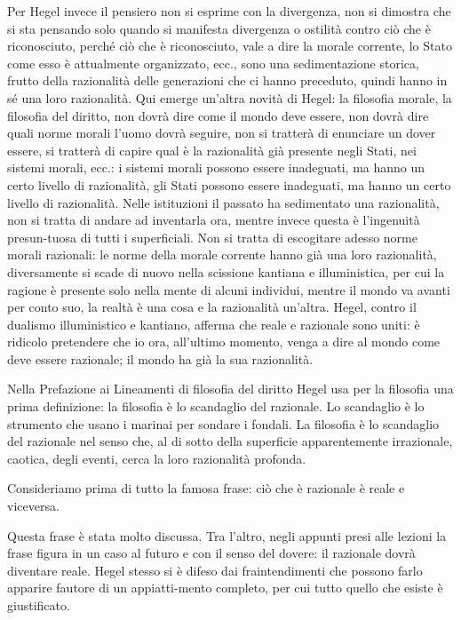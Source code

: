 \documentclass[a4paper,12pt,oneside,openany]{book}%
\begin{document}
Per Hegel invece il pensiero non si esprime con la divergenza, non si dimostra che si sta pensando solo quando si manifesta divergenza o ostilità contro ciò che è riconosciuto, perché ciò che è riconosciuto, vale a dire la morale corrente, lo Stato come esso è attualmente organizzato, ecc., sono una sedimentazione storica, frutto della razionalità delle generazioni che ci hanno preceduto, quindi hanno in sé una loro razionalità. Qui emerge un’altra novità di Hegel: la filosofia morale, la filosofia del diritto, non dovrà dire come il mondo deve essere, non dovrà dire quali norme morali l’uomo dovrà seguire, non si tratterà di enunciare un dover essere, si tratterà di capire qual è la razionalità già presente negli Stati, nei sistemi morali, ecc.: i sistemi morali possono essere inadeguati, ma hanno un certo livello di razionalità, gli Stati possono essere inadeguati, ma hanno un certo livello di razionalità. Nelle istituzioni il passato ha sedimentato una razionalità, non si tratta di andare ad inventarla ora, mentre invece questa è l’ingenuità presun-tuosa di tutti i superficiali. Non si tratta di escogitare adesso norme morali razionali: le norme della morale corrente hanno già una loro razionalità, diversamente si scade di nuovo nella scissione kantiana e illuministica, per cui la ragione è presente solo nella mente di alcuni individui, mentre il mondo va avanti per conto suo, la realtà è una cosa e la razionalità un’altra. Hegel, contro il dualismo illuministico e kantiano, afferma che reale e razionale sono uniti: è ridicolo pretendere che io ora, all’ultimo momento, venga a dire al mondo come deve essere razionale; il mondo ha già la sua razionalità.
	
Nella Prefazione ai Lineamenti di filosofia del diritto Hegel usa per la filosofia una prima definizione: la filosofia è lo scandaglio del razionale. Lo scandaglio è lo strumento che usano i marinai per sondare i fondali. La filosofia è lo scandaglio del razionale nel senso che, al di sotto della superficie apparentemente irrazionale, caotica, degli eventi, cerca la loro razionalità profonda.
	
Consideriamo prima di tutto la famosa frase: ciò che è razionale è reale e viceversa.

Questa frase è stata molto discussa. Tra l’altro, negli appunti presi alle lezioni la frase figura in un caso al futuro e con il senso del dovere: il razionale dovrà diventare reale. Hegel stesso si è difeso dai fraintendimenti che possono farlo apparire fautore di un appiatti-mento completo, per cui tutto quello che esiste è giustificato.	
\end{document}
